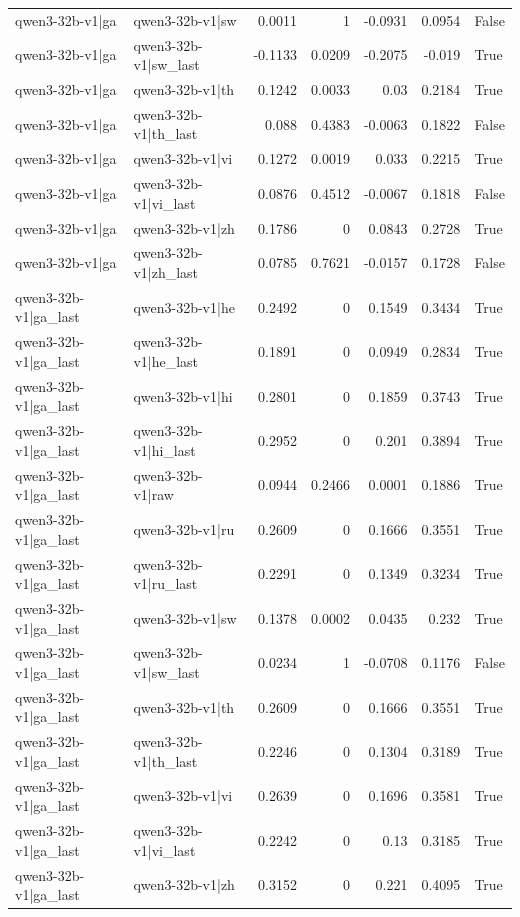 \begin{table}
\begin{tabular}{l l r r r r l}
qwen3-32b-v1|ga & qwen3-32b-v1|sw & 0.0011 & 1 & -0.0931 & 0.0954 & False \\
qwen3-32b-v1|ga & qwen3-32b-v1|sw_last & -0.1133 & 0.0209 & -0.2075 & -0.019 & True \\
qwen3-32b-v1|ga & qwen3-32b-v1|th & 0.1242 & 0.0033 & 0.03 & 0.2184 & True \\
qwen3-32b-v1|ga & qwen3-32b-v1|th_last & 0.088 & 0.4383 & -0.0063 & 0.1822 & False \\
qwen3-32b-v1|ga & qwen3-32b-v1|vi & 0.1272 & 0.0019 & 0.033 & 0.2215 & True \\
qwen3-32b-v1|ga & qwen3-32b-v1|vi_last & 0.0876 & 0.4512 & -0.0067 & 0.1818 & False \\
qwen3-32b-v1|ga & qwen3-32b-v1|zh & 0.1786 & 0 & 0.0843 & 0.2728 & True \\
qwen3-32b-v1|ga & qwen3-32b-v1|zh_last & 0.0785 & 0.7621 & -0.0157 & 0.1728 & False \\
qwen3-32b-v1|ga_last & qwen3-32b-v1|he & 0.2492 & 0 & 0.1549 & 0.3434 & True \\
qwen3-32b-v1|ga_last & qwen3-32b-v1|he_last & 0.1891 & 0 & 0.0949 & 0.2834 & True \\
qwen3-32b-v1|ga_last & qwen3-32b-v1|hi & 0.2801 & 0 & 0.1859 & 0.3743 & True \\
qwen3-32b-v1|ga_last & qwen3-32b-v1|hi_last & 0.2952 & 0 & 0.201 & 0.3894 & True \\
qwen3-32b-v1|ga_last & qwen3-32b-v1|raw & 0.0944 & 0.2466 & 0.0001 & 0.1886 & True \\
qwen3-32b-v1|ga_last & qwen3-32b-v1|ru & 0.2609 & 0 & 0.1666 & 0.3551 & True \\
qwen3-32b-v1|ga_last & qwen3-32b-v1|ru_last & 0.2291 & 0 & 0.1349 & 0.3234 & True \\
qwen3-32b-v1|ga_last & qwen3-32b-v1|sw & 0.1378 & 0.0002 & 0.0435 & 0.232 & True \\
qwen3-32b-v1|ga_last & qwen3-32b-v1|sw_last & 0.0234 & 1 & -0.0708 & 0.1176 & False \\
qwen3-32b-v1|ga_last & qwen3-32b-v1|th & 0.2609 & 0 & 0.1666 & 0.3551 & True \\
qwen3-32b-v1|ga_last & qwen3-32b-v1|th_last & 0.2246 & 0 & 0.1304 & 0.3189 & True \\
qwen3-32b-v1|ga_last & qwen3-32b-v1|vi & 0.2639 & 0 & 0.1696 & 0.3581 & True \\
qwen3-32b-v1|ga_last & qwen3-32b-v1|vi_last & 0.2242 & 0 & 0.13 & 0.3185 & True \\
qwen3-32b-v1|ga_last & qwen3-32b-v1|zh & 0.3152 & 0 & 0.221 & 0.4095 & True \\

\end{tabular}
\end{table}
